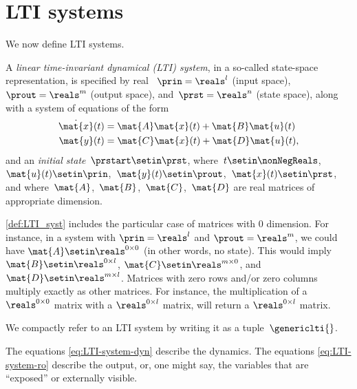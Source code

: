 
\section{LTI systems}
\label{sec:LTI-systems}

We now define LTI systems.


\begin{definition}
    \label{def:LTI_syst}
    A \emph{linear time-invariant dynamical (LTI) system}, in a so-called state-space representation, is specified by real ~$\prin=\reals^l$ (input space),~$\prout=\reals^m$ (output space), and~$\prst=\reals^n$ (state space), along with a system of equations of the form
    \begin{align}
        \dot{\mat{x}}(t) & = \mat{A}\mat{x}(t) + \mat{B}\mat{u}(t) \label{eq:LTI-system-dyn} \\
        \mat{y}(t)       & = \mat{C}\mat{x}(t) + \mat{D}\mat{u}(t) \label{eq:LTI-system-ro},
    \end{align}
    and an \emph{initial state}~$\prstart\setin \prst$, where~$t \setin \nonNegReals$,~$\mat{u}(t) \setin \prin$,~$\mat{y}(t) \setin \prout$,~$\mat{x}(t) \setin \prst$, and where~$\mat{A}$,~$\mat{B}$,~$\mat{C}$,~$\mat{D}$ are real matrices of appropriate dimension.
\end{definition}
\begin{remark}
    \cref{def:LTI_syst} includes the particular case of matrices with 0 dimension.
    For instance, in a system with $\prin=\reals^l$ and $\prout=\reals^m$, we could have $\mat{A}\setin \reals^{0\times 0}$ (in other words, no state).
    This would imply $\mat{B}\setin \reals^{0\times l}$, $\mat{C}\setin \reals^{m\times 0}$, and $\mat{D}\setin \reals^{m\times l}$.
    Matrices with zero rows and/or zero columns multiply exactly as other matrices.
    For instance, the multiplication of a $\reals^{0\times 0}$ matrix with a $\reals^{0\times l}$ matrix, will return a $\reals^{0\times l}$ matrix.
\end{remark}

We compactly refer to an LTI system by writing it as a tuple~$\genericlti{}$.

The equations \cref{eq:LTI-system-dyn} describe the dynamics.
The equations \cref{eq:LTI-system-ro} describe the output, or, one might say, the variables that are ``exposed'' or externally visible.

